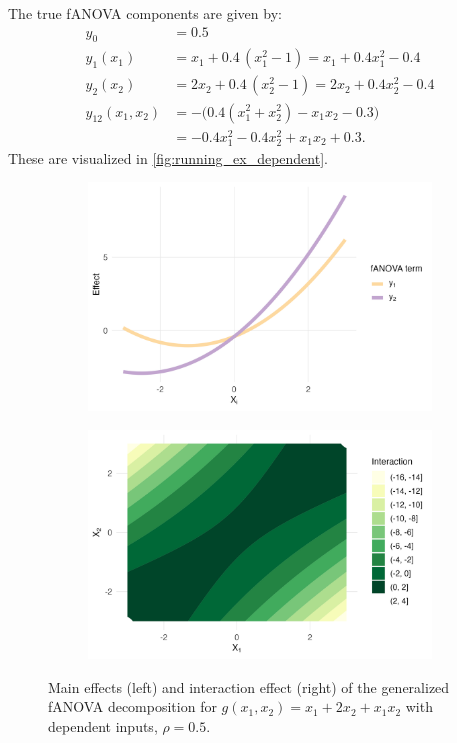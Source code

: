 The true fANOVA components are given by:
\begin{align*}
y_0 &= 0.5 \\[3pt]
y_1(x_1) &= x_1 + 0.4\,(x_1^2 - 1)
        = x_1 + 0.4x_1^2 - 0.4 \\[3pt]
y_2(x_2) &= 2x_2 + 0.4\,(x_2^2 - 1)
        = 2x_2 + 0.4x_2^2 - 0.4 \\[3pt]
y_{12}(x_1,x_2) 
&= -\Big( 0.4(x_1^2 + x_2^2) - x_1 x_2 - 0.3 \Big) \\[3pt]
&= -0.4x_1^2 - 0.4x_2^2 + x_1 x_2 + 0.3.
\end{align*}
These are visualized in \autoref{fig:running_ex_dependent}.
\begin{figure}[htpb]
    \centering
    \begin{subfigure}[t]{0.49\textwidth}
        \centering
        \includegraphics[width=\textwidth]{images/experiment_section/running_example_a1p10_a2p20_a11p00_a22p00_a12p10_rhop05_main.png}
    \end{subfigure}%
    \hfill
    \begin{subfigure}[t]{0.49\textwidth}
        \centering
        \includegraphics[width=\textwidth]{images/experiment_section/running_example_a1p10_a2p20_a11p00_a22p00_a12p10_rhop05_interaction.png}
    \end{subfigure}
    \caption{Main effects (left) and interaction effect (right) of the generalized fANOVA decomposition for $g(x_1, x_2) = x_1 + 2 x_2 + x_1 x_2$ with dependent inputs, $\rho = 0.5$.}
    \label{fig:running_ex_dependent}
\end{figure}
